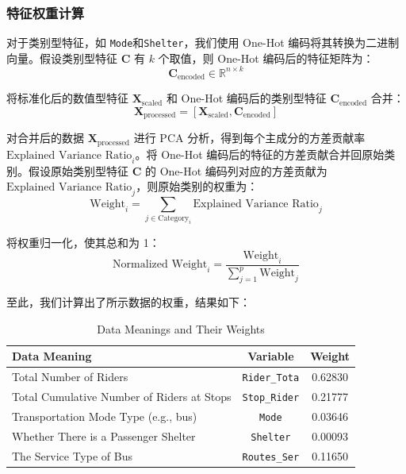 \documentclass[12pt, a4paper, oneside]{ctexart}
\begin{document}
\subsubsection{特征权重计算}

对于类别型特征，如 \texttt{Mode}和\texttt{Shelter}，我们使用 One-Hot 编码将其转换为二进制向量。假设类别型特征 $\mathbf{C}$ 有 $k$ 个取值，则 One-Hot 编码后的特征矩阵为：
\begin{equation}
\mathbf{C}_{\text{encoded}} \in \mathbb{R}^{n \times k}
\end{equation}

将标准化后的数值型特征 $\mathbf{X}_{\text{scaled}}$ 和 One-Hot 编码后的类别型特征 $\mathbf{C}_{\text{encoded}}$ 合并：
\begin{equation}
\mathbf{X}_{\text{processed}} = [\mathbf{X}_{\text{scaled}}, \mathbf{C}_{\text{encoded}}]
\end{equation}

对合并后的数据 $\mathbf{X}_{\text{processed}}$ 进行 PCA 分析，得到每个主成分的方差贡献率 $\text{Explained Variance Ratio}_i$。将 One-Hot 编码后的特征的方差贡献合并回原始类别。假设原始类别型特征 $\mathbf{C}$ 的 One-Hot 编码列对应的方差贡献为 $\text{Explained Variance Ratio}_j$，则原始类别的权重为：
\begin{equation}
\text{Weight}_i = \sum_{j \in \text{Category}_i} \text{Explained Variance Ratio}_j
\end{equation}

将权重归一化，使其总和为 1：
\begin{equation}
\text{Normalized Weight}_i = \frac{\text{Weight}_i}{\sum_{j = 1}^p \text{Weight}_j}
\end{equation}

至此，我们计算出了所示数据的权重，结果如下：

\begin{table}[H]
  \centering
  \caption{Data Meanings and Their Weights}
  \label{tab:data_weights}
  \begin{tabular}{@{}lcc@{}}
      \toprule
      \textbf{Data Meaning} & \textbf{Variable} & \textbf{Weight} \\
      \midrule
      Total Number of Riders & \texttt{Rider\_Tota} & 0.62830 \\
      Total Cumulative Number of Riders at Stops & \texttt{Stop\_Rider} & 0.21777 \\
      Transportation Mode Type (e.g., bus) & \texttt{Mode} & 0.03646 \\
      Whether There is a Passenger Shelter & \texttt{Shelter} & 0.00093 \\
      The Service Type of Bus & \texttt{Routes\_Ser} & 0.11650 \\
      \bottomrule
  \end{tabular}
\end{table}
\end{document}
